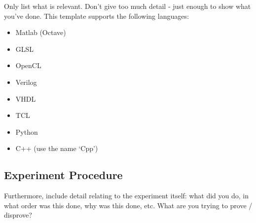 Only list what is relevant.  Don't give too much detail - just enough to show what you've done.  This template supports the following languages:

\begin{itemize}
  \item Matlab (Octave)
  \item GLSL
  \item OpenCL
  \item Verilog
  \item VHDL
  \item TCL
  \item Python
  \item C++ (use the name `Cpp')
\end{itemize}

\subsection{Experiment Procedure}
Furthermore, include detail relating to the experiment itself: what did you do, in what order was this done, why was this done, etc.  What are you trying to prove / disprove?
